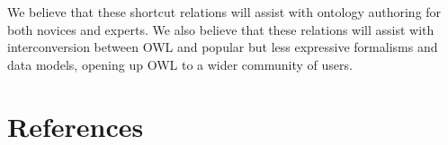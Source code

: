 \documentclass{llncs}
\begin{document}
We believe that these shortcut relations will assist with ontology
authoring for both novices and experts. We also believe that these
relations will assist with interconversion between OWL and popular but
less expressive formalisms and data models, opening up OWL to a wider
community of users.

\section{References}



\end{document}
